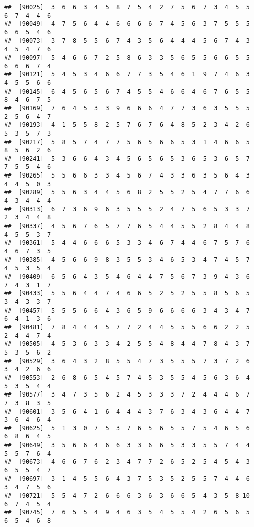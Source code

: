 \documentclass[
]{book}
\begin{document}
\begin{verbatim}
##  [90025]  3  6  6  3  4  5  8  7  5  4  2  7  5  6  7  3  4  5  5  6  7  4  4  6
##  [90049]  4  7  5  6  4  4  6  6  6  6  7  4  5  6  3  7  5  5  5  6  6  5  4  6
##  [90073]  3  7  8  5  5  6  7  4  3  5  6  4  4  4  5  6  7  4  3  4  5  4  7  6
##  [90097]  5  4  6  6  7  2  5  8  6  3  3  5  6  5  5  6  6  5  5  6  6  6  7  4
##  [90121]  5  4  5  3  4  6  6  7  7  3  5  4  6  1  9  7  4  6  3  4  5  5  6  6
##  [90145]  6  4  5  6  5  6  7  4  5  5  4  6  6  4  6  7  6  5  5  8  4  6  7  5
##  [90169]  7  6  4  5  3  3  9  6  6  6  4  7  7  3  6  3  5  5  5  2  5  6  4  7
##  [90193]  4  1  5  5  8  2  5  7  6  7  6  4  8  5  2  3  4  2  6  5  3  5  7  3
##  [90217]  5  8  5  7  4  7  7  5  6  5  6  6  5  3  1  4  6  6  5  8  5  6  2  6
##  [90241]  5  3  6  6  4  3  4  5  6  5  6  5  3  6  5  3  6  5  7  7  5  5  4  6
##  [90265]  5  5  6  6  3  3  4  5  6  7  4  3  3  6  3  5  6  4  3  4  4  5  0  3
##  [90289]  5  5  6  3  4  4  5  6  8  2  5  5  2  5  4  7  7  6  6  4  3  4  4  4
##  [90313]  6  7  3  6  9  6  3  5  5  5  2  4  7  5  6  5  3  3  7  2  3  4  4  8
##  [90337]  4  5  6  7  6  5  7  7  6  5  4  4  5  5  2  8  4  4  8  4  5  5  3  7
##  [90361]  5  4  4  6  6  6  5  3  3  4  6  7  4  4  6  7  5  7  6  4  6  7  3  5
##  [90385]  4  5  6  6  9  8  3  5  5  3  4  6  5  3  4  7  4  5  7  4  5  3  5  4
##  [90409]  6  5  6  4  3  5  4  6  4  4  7  5  6  7  3  9  4  3  6  7  4  3  1  7
##  [90433]  5  5  6  4  4  7  4  6  6  5  2  5  2  5  5  8  5  6  5  3  4  3  3  7
##  [90457]  5  5  5  6  6  4  3  6  5  9  6  6  6  6  3  4  3  4  7  6  4  1  3  6
##  [90481]  7  8  4  4  4  5  7  7  2  4  4  5  5  5  6  6  2  2  5  2  4  4  7  4
##  [90505]  4  5  3  6  3  3  4  2  5  5  4  8  4  4  7  8  4  3  7  5  3  5  6  2
##  [90529]  3  6  4  3  2  8  5  5  4  7  3  5  5  5  7  3  7  2  6  3  4  2  6  6
##  [90553]  2  6  8  6  5  4  5  7  4  5  3  5  5  4  5  6  3  6  4  5  3  5  4  4
##  [90577]  3  4  7  3  5  6  2  4  5  3  3  3  7  2  4  4  4  6  7  7  3  8  3  5
##  [90601]  3  5  6  4  1  6  4  4  4  3  7  6  3  4  3  6  4  4  7  3  6  4  6  4
##  [90625]  5  1  3  0  7  5  3  7  6  5  6  5  5  7  5  4  6  5  6  6  8  6  4  5
##  [90649]  3  5  6  6  4  6  6  3  3  6  6  5  3  3  5  5  7  4  4  5  5  7  6  4
##  [90673]  4  6  6  7  6  2  3  4  7  7  2  6  5  2  5  4  5  4  3  6  5  5  4  7
##  [90697]  3  1  4  5  5  6  4  3  7  5  3  5  2  5  5  7  4  4  6  3  4  7  5  6
##  [90721]  5  5  4  7  2  6  6  6  3  6  3  6  6  5  4  3  5  8 10  6  7  4  5  4
##  [90745]  7  6  5  5  4  9  4  6  3  5  4  5  5  4  2  6  5  6  5  6  5  4  6  8

\end{verbatim}
\end{document}
